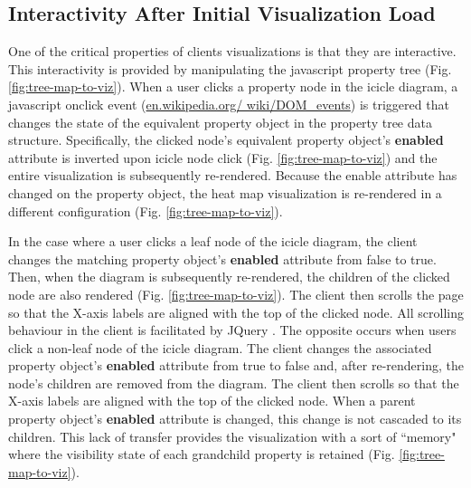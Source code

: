 \subsection{Interactivity After Initial Visualization Load}

One of the critical properties of clients visualizations is that they are 
interactive. This interactivity is provided by manipulating the \gls{javascript} 
property tree (Fig. \ref{fig:tree-map-to-viz}). When a user clicks a property 
node in the icicle diagram, a \gls{javascript} onclick event \cite{dom-events} 
(\href{http://en.wikipedia.org/wiki/DOM_events}{en.wikipedia.org/ 
wiki/DOM\_events}) is triggered that changes the state of the equivalent 
property object in the property tree data structure. Specifically, the clicked 
node's equivalent property object's \textbf{enabled} attribute is inverted upon 
icicle node click (Fig. \ref{fig:tree-map-to-viz}) and the entire visualization 
is subsequently re-rendered. Because the enable attribute has changed on the 
property object, the heat map visualization is re-rendered in a different 
configuration (Fig. \ref{fig:tree-map-to-viz}). 

In the case where a user clicks a leaf node of the icicle diagram, the client 
changes the matching property object's \textbf{enabled} attribute from false to 
true. Then, when the diagram is subsequently re-rendered, the children of the 
clicked node are also rendered (Fig. \ref{fig:tree-map-to-viz}). The client then 
scrolls the page so that the X-axis labels are aligned with the top of the 
clicked node. All scrolling behaviour in the client is facilitated by JQuery 
\cite{li2012jquery}. The opposite occurs when users click a non-leaf node of the 
icicle diagram. The client changes the associated property object's 
\textbf{enabled} attribute from true to false and, after re-rendering, the 
node's children are removed from the diagram. The client then scrolls so that 
the X-axis labels are aligned with the top of the clicked node. When a parent 
property object's \textbf{enabled} attribute is changed, this change is not 
cascaded to its children. This lack of transfer provides the visualization with 
a sort of ``memory" where the visibility state of each grandchild property is 
retained (Fig. \ref{fig:tree-map-to-viz}).

